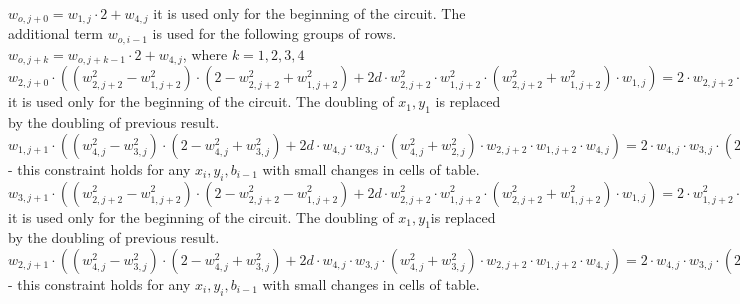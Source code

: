 \begin{center}
$w_{o, j + 0} = w_{1, j} \cdot 2 + w_{4, j}$ it is used only for the beginning of the circuit. The additional term $w_{o, i - 1}$ is used for the following groups of rows. \\
$w_{o, j + k} = w_{o, j + k - 1} \cdot 2 + w_{4, j}$, where $k = 1, 2, 3, 4$\\

$w_{2, j + 0} \cdot ((w_{2, j + 2}^2 - w_{1, j + 2}^2) \cdot (2 - w_{2, j + 2}^2 + w_{1, j + 2}^2) + 2d \cdot w_{2, j + 2}^2 \cdot w_{1, j + 2}^2 \cdot (w_{2, j + 2}^2 + w_{1, j + 2}^2) \cdot w_{1, j}) = 
2 \cdot w_{2, j + 2} \cdot (w_{2, j + 2} \cdot w_{1,j} + 1 - w_{1,j}) \cdot w_{1, j + 2} \cdot (2 - w_{2, j + 2}^2 + w_{1, j + 2}^2) 
+ w_{1, j + 2} \cdot (w_{2, j + 2}^2 + w_{1, j + 2}^2) \cdot (w_{2, j + 2}^2 - w_{1, j + 2}^2)\cdot w_{1, j}$ it is used only for the beginning of the circuit. The doubling of $x_1, y_1$ is replaced by the doubling of previous result.\\

$w_{1, j + 1} \cdot ((w_{4, j }^2 - w_{3, j }^2) \cdot (2 - w_{4, j}^2 + w_{3, j}^2) + 2d \cdot w_{4, j } \cdot w_{3, j } \cdot (w_{4, j}^2 + w_{2, j}^2) \cdot w_{2, j + 2} \cdot w_{1, j + 2} \cdot w_{4, j}) = 
2 \cdot w_{4, j } \cdot w_{3, j } \cdot (2 - w_{4, j }^2 + w_{3, j }^2) \cdot (w_{2, j + 2} \cdot w_{4,j} + 1 - w_{4,j})  
+ w_{3, j } \cdot (w_{4, j }^2 + w_{3, j }^2) \cdot (w_{4, j }^2 - w_{3, j }^2) \cdot w_{1, j + 2} \cdot w_{4, j}$ - this constraint holds for any $x_i, y_i, b_{i -1}$ with small changes in cells of table. \\

$w_{3, j+1} \cdot ((w_{2, j + 2}^2 - w_{1, j + 2}^2) \cdot (2 - w_{2, j + 2}^2 - w_{1, j + 2}^2) + 2d \cdot w_{2, j + 2}^2 \cdot w_{1, j + 2}^2 \cdot (w_{2, j + 2}^2 + w_{1, j + 2}^2) \cdot w_{1, j}) = 
2 \cdot w_{1, j + 2}^2 \cdot (w_{2, j + 2} \cdot (2 - w_{2, j + 2}^2 + w_{1, j + 2}^2)\cdot w_{1, j}  
+ (w_{2, j + 2}^2 - w_{1, j + 2}^2)\cdot (w_{2, j + 2}^2 + w_{1, j + 2}^2) \cdot (w_{2, j + 2} \cdot w_{1,j} + 1 - w_{1,j}) $ it is used only for the beginning of the circuit. The doubling of $x_1, y_1$is replaced by the doubling of previous result.\\

$w_{2, j + 1} \cdot ((w_{4, j }^2 - w_{3, j }^2) \cdot (2 - w_{4, j}^2 + w_{3, j}^2) + 2d \cdot w_{4, j } \cdot w_{3, j } \cdot (w_{4, j}^2 + w_{3, j}^2) \cdot w_{2, j + 2} \cdot w_{1, j + 2} \cdot w_{4, j}) = 
2 \cdot w_{4, j } \cdot w_{3, j } \cdot (2 - w_{4, j }^2 + w_{3, j }^2) \cdot w_{1, j + 2} \cdot w_{4,j}  
+  (w_{2, j + 2} \cdot w_{4,j} + 1 - w_{4,j}) \cdot (w_{4, j }^2 + w_{3, j }^2) \cdot (w_{4, j }^2 - w_{3, j }^2) $ - this constraint holds for any $x_i, y_i, b_{i -1}$ with small changes in cells of table. \\

\end{center}